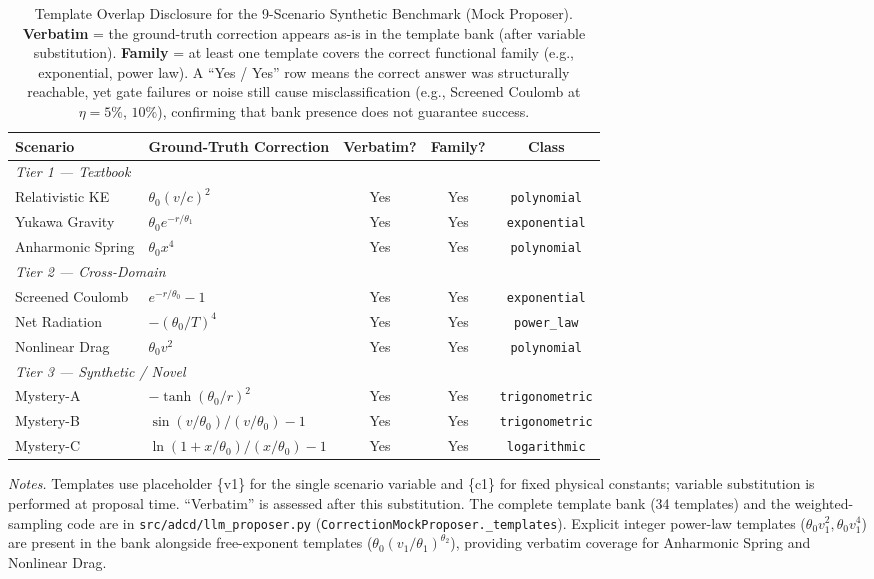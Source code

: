 \begin{table}[H]
\centering\footnotesize
\caption{%
  Template Overlap Disclosure for the 9-Scenario Synthetic Benchmark (Mock Proposer).
  \textbf{Verbatim} = the ground-truth correction appears as-is in the template bank (after variable substitution).
  \textbf{Family} = at least one template covers the correct functional family (e.g., exponential, power law).
  A ``Yes / Yes'' row means the correct answer was structurally reachable, yet gate failures or noise still cause
  misclassification (e.g., Screened Coulomb at $\eta=5\%$, $10\%$), confirming that bank presence does not
  guarantee success.
}
\label{tab:template_overlap_synthetic}
\begin{tabularx}{\textwidth}{l l c c c}
\toprule
\textbf{Scenario} & \textbf{Ground-Truth Correction} & \textbf{Verbatim?} & \textbf{Family?} & \textbf{Class} \\
\midrule
\multicolumn{5}{l}{\textit{Tier 1 --- Textbook}} \\
Relativistic KE      & $\theta_0 (v/c)^2$                              & Yes & Yes & \texttt{polynomial}    \\
Yukawa Gravity       & $\theta_0 e^{-r/\theta_1}$                      & Yes & Yes & \texttt{exponential}   \\
Anharmonic Spring    & $\theta_0 x^4$                                  & Yes & Yes & \texttt{polynomial}    \\
\midrule
\multicolumn{5}{l}{\textit{Tier 2 --- Cross-Domain}} \\
Screened Coulomb     & $e^{-r/\theta_0} - 1$                           & Yes & Yes & \texttt{exponential}   \\
Net Radiation        & $-(\theta_0/T)^4$                               & Yes & Yes & \texttt{power\_law}    \\
Nonlinear Drag       & $\theta_0 v^2$                                  & Yes & Yes & \texttt{polynomial}    \\
\midrule
\multicolumn{5}{l}{\textit{Tier 3 --- Synthetic / Novel}} \\
Mystery-A            & $-\tanh(\theta_0/r)^2$                          & Yes & Yes & \texttt{trigonometric} \\
Mystery-B            & $\sin(v/\theta_0)/(v/\theta_0) - 1$             & Yes & Yes & \texttt{trigonometric} \\
Mystery-C            & $\ln(1+x/\theta_0)/(x/\theta_0) - 1$           & Yes & Yes & \texttt{logarithmic}   \\
\bottomrule
\end{tabularx}
\smallskip
\raggedright
\textit{Notes.} Templates use placeholder \{v1\} for the single scenario variable and \{c1\} for fixed physical
constants; variable substitution is performed at proposal time. ``Verbatim'' is assessed after this substitution.
The complete template bank (34 templates) and the weighted-sampling code are in
\texttt{src/adcd/llm\_proposer.py} (\texttt{CorrectionMockProposer.\_templates}).
Explicit integer power-law templates ($\theta_0 v_1^2, \theta_0 v_1^4$) are present in the bank alongside free-exponent templates ($\theta_0 (v_1/\theta_1)^{\theta_2}$), providing verbatim coverage for Anharmonic Spring and Nonlinear Drag.
\end{table}
